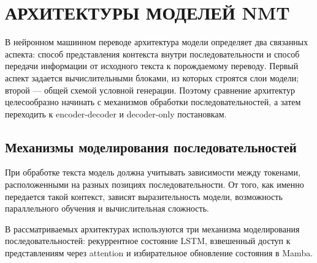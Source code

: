 \section{АРХИТЕКТУРЫ МОДЕЛЕЙ NMT}

В нейронном машинном переводе архитектура модели определяет два связанных аспекта: способ представления контекста внутри последовательности и способ передачи информации от исходного текста к порождаемому переводу. Первый аспект задается вычислительными блоками, из которых строятся слои модели; второй --- общей схемой условной генерации. Поэтому сравнение архитектур целесообразно начинать с механизмов обработки последовательностей, а затем переходить к encoder-decoder и decoder-only постановкам.

\subsection{Механизмы моделирования последовательностей}

При обработке текста модель должна учитывать зависимости между токенами, расположенными на разных позициях последовательности. От того, как именно передается такой контекст, зависят выразительность модели, возможность параллельного обучения и вычислительная сложность.

В рассматриваемых архитектурах используются три механизма моделирования последовательностей: рекуррентное состояние LSTM, взвешенный доступ к представлениям через attention и избирательное обновление состояния в Mamba.

